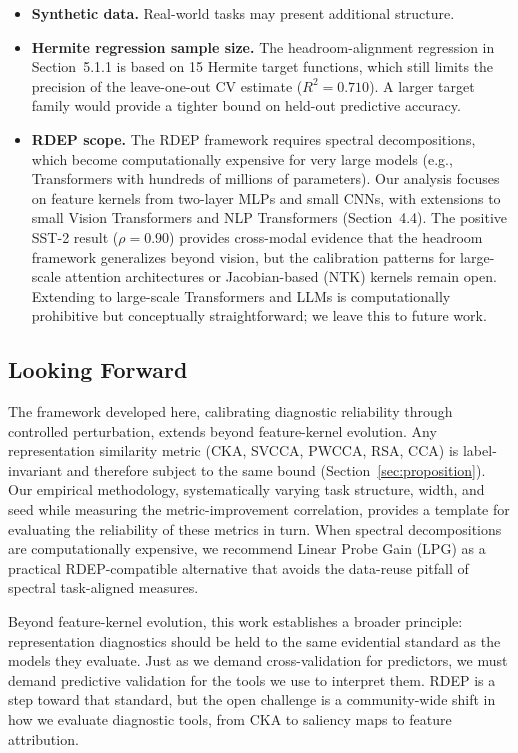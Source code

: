 \documentclass[twoside,11pt]{article}
\begin{document}
\begin{itemize}
    \item \textbf{Synthetic data.}  Real-world tasks may present additional structure.
    \item \textbf{Hermite regression sample size.}  The headroom-alignment regression in Section~5.1.1 is based on 15 Hermite target functions, which still limits the precision of the leave-one-out CV estimate ($R^2=0.710$).  A larger target family would provide a tighter bound on held-out predictive accuracy.
    \item \textbf{RDEP scope.}  The RDEP framework requires spectral decompositions, which become computationally expensive for very large models (e.g., Transformers with hundreds of millions of parameters).  Our analysis focuses on feature kernels from two-layer MLPs and small CNNs, with extensions to small Vision Transformers and NLP Transformers (Section~4.4).  The positive SST-2 result ($\rho=0.90$) provides cross-modal evidence that the headroom framework generalizes beyond vision, but the calibration patterns for large-scale attention architectures or Jacobian-based (NTK) kernels remain open.  Extending to large-scale Transformers and LLMs is computationally prohibitive but conceptually straightforward; we leave this to future work.
\end{itemize}

\subsection{Looking Forward}\label{sec:future}

The framework developed here, calibrating diagnostic reliability through controlled perturbation, extends beyond feature-kernel evolution.  Any representation similarity metric (CKA, SVCCA, PWCCA, RSA, CCA) is label-invariant and therefore subject to the same bound (Section~\ref{sec:proposition}).  Our empirical methodology, systematically varying task structure, width, and seed while measuring the metric-improvement correlation, provides a template for evaluating the reliability of these metrics in turn.  When spectral decompositions are computationally expensive, we recommend Linear Probe Gain (LPG) as a practical RDEP-compatible alternative that avoids the data-reuse pitfall of spectral task-aligned measures.

Beyond feature-kernel evolution, this work establishes a broader principle: representation diagnostics should be held to the same evidential standard as the models they evaluate. Just as we demand cross-validation for predictors, we must demand predictive validation for the tools we use to interpret them. RDEP is a step toward that standard, but the open challenge is a community-wide shift in how we evaluate diagnostic tools, from CKA to saliency maps to feature attribution.
\end{document}
